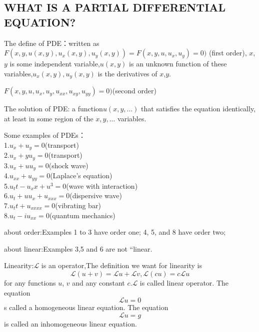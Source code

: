 \documentclass[hazy,blue,11pt]{elegantnote}
\begin{document}
\subsection{WHAT IS A PARTIAL DIFFERENTIAL EQUATION?}
The define of PDE：written as $F(x,y,u(x,y),u_x(x,y),u_y(x,y))=F(x,y,u,u_x,u_y)=0)$ (first order), $x$,$y$ is some independent variable,$u(x,y)$ is an unknown function of these variables,$u_x(x,y),u_y(x,y)$ is the derivatives of $x$,$y$.\par
$F(x,y,u,u_x,u_y,u_{xx},u_{xy},u_{yy})=0)$(second order)

The solution of PDE: a function$u(x,y,...)$ that satisfies the equation identically, at least in some region of the $x, y, . . .$ variables.

Some examples of PDEs：\\
1.$u_x+u_y=0$(transport)\\
2.$u_x+yu_y=0$(transport)\\
3.$u_x+uu_y=0$(shock wave)\\
4.$u_{xx}+u_{yy}=0$(Laplace’s equation)\\
5.$u_tt-u_xx+u^3=0$(wave with interaction)\\
6.$u_t+uu_x+u_{xxx}=0$(dispersive wave)\\
7.$u_tt+u_{xxxx}=0$(vibrating bar)\\
8.$u_t-iu_{xx}=0$(quantum mechanics)

about order:Examples 1 to 3 have order one; 4, 5, and 8 have order two;\par
about linear:Examples 3,5 and 6 are not “linear.\par

\begin{note}
Linearity:$\mathscr{L}$ is an operator,The definition we want for linearity is 
\begin{equation}
   \mathscr{L}(u+v)=\mathscr{L}u+\mathscr{L}v,
   \mathscr{L}(cu)=c\mathscr{L}u
\end{equation}
for any functions $u$, $v$ and any constant $c$.$\mathscr{L}$ is called linear operator. The equation
\begin{equation}
    \mathscr{L}u=0
\end{equation}
s called a homogeneous linear equation. The equation
\begin{equation}
    \mathscr{L}u=g
\end{equation} is called an inhomogeneous linear equation.
     
\end{note}
\end{document}
